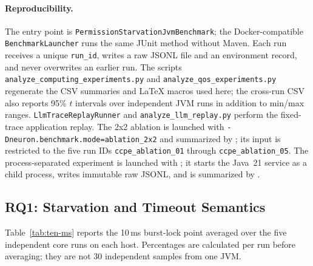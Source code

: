 \paragraph{Reproducibility.}
The entry point is
\texttt{PermissionStarvationJvmBenchmark}; the Docker-compatible
\texttt{BenchmarkLauncher} runs the same JUnit method without Maven. Each
run receives a unique \texttt{run\_id}, writes a raw JSONL file and an
environment record, and never overwrites an earlier run. The scripts
\texttt{analyze\_computing\_experiments.py} and
\texttt{analyze\_qos\_experiments.py} regenerate the CSV summaries and
LaTeX macros used here; the cross-run CSV also reports 95\% $t$ intervals
over independent JVM runs in addition to min/max ranges.
\texttt{LlmTraceReplayRunner} and
\texttt{analyze\_llm\_replay.py} perform the fixed-trace application replay.
The 2x2 ablation is launched with
\texttt{-Dneuron.benchmark.mode=ablation\_2x2} and summarized by
; its input is restricted
to the five run IDs \texttt{ccpe\_ablation\_01} through
\texttt{ccpe\_ablation\_05}.
The process-separated experiment is launched with
; it
starts the Java~21 service as a child process, writes immutable raw JSONL, and
is summarized by .

\subsection{RQ1: Starvation and Timeout Semantics}

Table~\ref{tab:ten-ms} reports the 10\,ms burst-lock point averaged over the
five independent core runs on each host. Percentages are calculated per run
before averaging; they are not 30 independent samples from one JVM.

